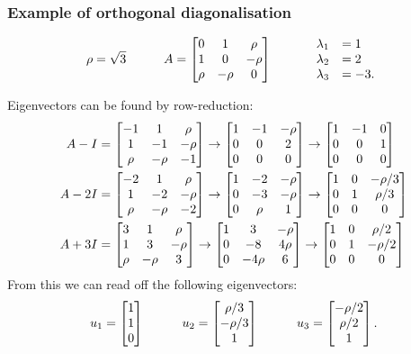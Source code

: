 \documentclass[9pt]{beamer}
\begin{document}
\begin{frame}[t]
 \frametitle{Example of orthogonal diagonalisation}
 \vspace{-3ex}
 \[ \rho = \sqrt{3} \hspace{3em}
    A=\left[\begin{matrix} 0&1&\rho \\ 1&0&-\rho \\ \rho & -\rho & 0\end{matrix}\right]
    \hspace{3em}
    \begin{array}{rl}
     \lambda_1 &= 1 \\
     \lambda_2 &= 2 \\
     \lambda_3 &= -3.
    \end{array}
 \]
 \reminderbar
 
 Eigenvectors can be found by row-reduction:
 \begin{align*}
  A-I &= 
   \left[\begin{matrix} -1&1&\rho \\ 1&-1&-\rho \\ \rho & -\rho & -1\end{matrix}\right]
   \to 
   \left[\begin{matrix} 1&-1&-\rho \\ 0 & 0 & 2 \\ 0&0&0 \end{matrix}\right]
   \to 
   \left[\begin{matrix} 1&-1&0 \\ 0 & 0 & 1 \\ 0&0&0 \end{matrix}\right] \\
  A-2I &=
   \left[\begin{matrix} -2&1&\rho \\ 1&-2&-\rho \\ \rho & -\rho & -2\end{matrix}\right]
   \to 
   \left[\begin{matrix} 1&-2&-\rho \\ 0&-3&-\rho \\ 0& \rho & 1 \end{matrix}\right] 
   \to 
   \left[\begin{matrix} 1&0&-\rho/3 \\ 0&1&\rho/3 \\ 0& 0 & 0 \end{matrix}\right] \\
  A+3I &= 
   \left[\begin{matrix} 3&1&\rho \\ 1&3&-\rho \\ \rho & -\rho & 3\end{matrix}\right]
   \to
   \left[\begin{matrix} 1&3&-\rho \\ 0&-8&4\rho \\ 0&-4\rho&6 \end{matrix}\right]
   \to 
   \left[\begin{matrix} 1&0&\rho/2 \\ 0&1&-\rho/2 \\ 0&0&0 \end{matrix}\right]
 \end{align*}
 From this we can read off the following eigenvectors:
 \[
    u_1 = \left[\begin{matrix} 1\\1\\0\end{matrix}\right] \hspace{3em}
    u_2 = \left[\begin{matrix} \rho/3 \\ -\rho/3\\ 1\end{matrix}\right] \hspace{3em}
    u_3 = \left[\begin{matrix} -\rho/2\\ \rho/2 \\ 1 \end{matrix}\right]. 
 \]
\end{frame}
\end{document}
